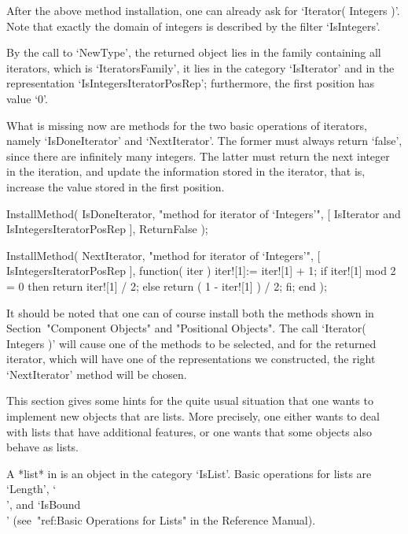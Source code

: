 After the above method installation, one can already ask for
`Iterator( Integers )'.
Note that exactly the domain of integers is described by
the filter `IsIntegers'.

By the call to `NewType', the returned object lies in the family
containing all iterators, which is `IteratorsFamily',
it lies in the category `IsIterator' and in the representation
`IsIntegersIteratorPosRep';
furthermore, the first position has value `0'.

What is missing now are methods for the two basic operations
of iterators, namely `IsDoneIterator' and `NextIterator'.
The former must always return `false', since there are infinitely
many integers.
The latter must return the next integer in the iteration,
and update the information stored in the iterator,
that is, increase the value stored in the first position.

\begintt
InstallMethod( IsDoneIterator,
    "method for iterator of `Integers'",
    [ IsIterator and IsIntegersIteratorPosRep ],
    ReturnFalse );

InstallMethod( NextIterator,
    "method for iterator of `Integers'",
    [ IsIntegersIteratorPosRep ],
    function( iter )
    iter![1]:= iter![1] + 1;
    if iter![1] mod 2 = 0 then
      return iter![1] / 2;
    else
      return ( 1 - iter![1] ) / 2;
    fi;
    end );
\endtt

It should be noted that one can of course install both the methods shown
in Section~"Component Objects" and "Positional Objects".
The call `Iterator( Integers )' will cause one of the methods to be
selected, and for the returned iterator, which will have one of the
representations we constructed, the right `NextIterator' method
will be chosen.


This section gives some hints for the quite usual situation that one wants
to implement new objects that are lists.
More precisely, one either wants to deal with lists that have additional
features, or one wants that some objects also behave as lists.

A *list* in {\GAP} is an object in the category `IsList'.
Basic operations for lists are `Length', `\\[\\]', and `IsBound\\[\\]'
(see~"ref:Basic Operations for Lists" in the Reference Manual).


